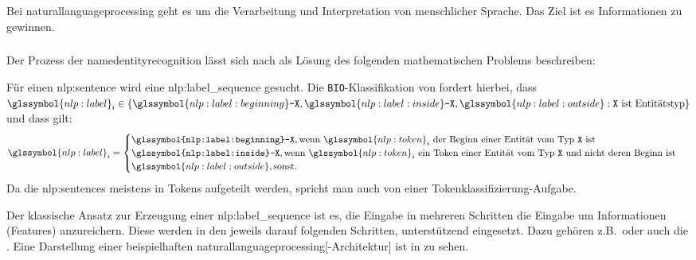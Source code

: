 Bei \gls{naturallanguageprocessing}
geht es um die Verarbeitung und Interpretation von menschlicher Sprache.
Das Ziel ist es Informationen zu gewinnen.

\subsubsection{}
Der Prozess der \gls{namedentityrecognition}
lässt sich nach \autocite{2006.15509} als Lösung des folgenden mathematischen Problems beschreiben:

\begin{prob}\label{prob:nlp:ner}
	Für einen \gls{nlp:sentence} 
	wird eine \gls{nlp:label_sequence}  gesucht.
	Die \texttt{BIO}-Klassifikation von \citeauthor{10.1145/2396761.2398506}
	\autocite{10.1145/2396761.2398506}
	fordert hierbei,
	dass \(
	\glssymbol{nlp:label}_i \in
	\left\lbrace
	\glssymbol{nlp:label:beginning}\texttt{-X},
	\glssymbol{nlp:label:inside}\texttt{-X},
	\glssymbol{nlp:label:outside}
	:
	\text{\texttt{X} ist Entitätstyp}
	\right\rbrace
	\)
	und dass gilt:
	\[
		\glssymbol{nlp:label}_i =
		\begin{cases}
			\texttt{\glssymbol{nlp:label:beginning}-X},
			\text{wenn \(\glssymbol{nlp:token}_i\)
				der Beginn einer Entität vom Typ \(\texttt{X}\) ist
			} \\
			\texttt{\glssymbol{nlp:label:inside}-X},
			\text{wenn \(\glssymbol{nlp:token}_i\)
				ein Token einer Entität vom Typ \(\texttt{X}\)
				und nicht deren Beginn ist
			} \\
			\glssymbol{nlp:label:outside}, \text{sonst}.
		\end{cases}
	\]
	Da die \glspl{nlp:sentence} meistens in Tokens aufgeteilt werden,
	spricht man auch von einer Tokenklassifizierung-Aufgabe.
\end{prob}

Der klassische Ansatz zur Erzeugung einer \gls{nlp:label_sequence} ist es,
die Eingabe in mehreren Schritten die Eingabe um Informationen (Features) anzureichern.
Diese werden in den jeweils darauf folgenden Schritten, unterstützend eingesetzt.
Dazu gehören z.B.\,  oder auch
die . %
Eine Darstellung einer beispielhaften \gls{naturallanguageprocessing}[-Architektur] ist in 
zu sehen.

